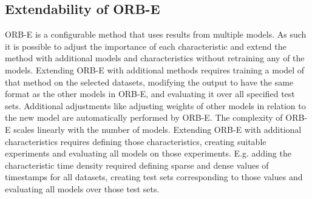 \subsection{Extendability of ORB-E}
ORB-E is a configurable method that uses results from multiple models.
As such it is possible to adjust the importance of each characteristic and extend the method with additional models and characteristics without retraining any of the models.
Extending ORB-E with additional methods requires training a model of that method on the selected datasets, modifying the output to have the same format as the other models in ORB-E, and evaluating it over all specified test sets. Additional adjustments like adjusting weights of other models in relation to the new model are automatically performed by ORB-E. The complexity of ORB-E scales linearly with the number of models.
Extending ORB-E with additional characteristics requires defining those characteristics, creating suitable experiments and evaluating all models on those experiments. E.g. adding the characteristic time density required defining sparse and dense values of timestamps for all datasets, creating test sets corresponding to those values and evaluating all models over those test sets.

